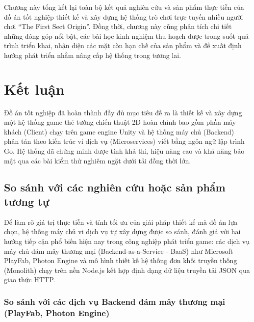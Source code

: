 \documentclass[../Project.tex]{subfiles}
\begin{document}
Chương này tổng kết lại toàn bộ kết quả nghiên cứu và sản phẩm thực tiễn của đồ án tốt nghiệp thiết kế và xây dựng hệ thống trò chơi trực tuyến nhiều người chơi ``The First Sect Origin''. Đồng thời, chương này cũng phân tích chi tiết những đóng góp nổi bật, các bài học kinh nghiệm thu hoạch được trong suốt quá trình triển khai, nhận diện các mặt còn hạn chế của sản phẩm và đề xuất định hướng phát triển nhằm nâng cấp hệ thống trong tương lai.

\section{Kết luận}
\label{sec:conclusion}

Đồ án tốt nghiệp đã hoàn thành đầy đủ mục tiêu đề ra là thiết kế và xây dựng một hệ thống game thẻ tướng chiến thuật 2D hoàn chỉnh bao gồm phần máy khách (Client) chạy trên game engine Unity và hệ thống máy chủ (Backend) phân tán theo kiến trúc vi dịch vụ (Microservices) \cite{newman2021building} viết bằng ngôn ngữ lập trình Go. Hệ thống đã chứng minh được tính khả thi, hiệu năng cao và khả năng bảo mật qua các bài kiểm thử nghiêm ngặt dưới tải đồng thời lớn.

\subsection{So sánh với các nghiên cứu hoặc sản phẩm tương tự}
\label{sec:comparison}

Để làm rõ giá trị thực tiễn và tính tối ưu của giải pháp thiết kế mà đồ án lựa chọn, hệ thống máy chủ vi dịch vụ tự xây dựng được so sánh, đánh giá với hai hướng tiếp cận phổ biến hiện nay trong công nghiệp phát triển game: các dịch vụ máy chủ đám mây thương mại (Backend-as-a-Service - BaaS) như Microsoft PlayFab, Photon Engine và mô hình thiết kế hệ thống đơn khối truyền thống (Monolith) chạy trên nền Node.js kết hợp định dạng dữ liệu truyền tải JSON qua giao thức HTTP.

\subsubsection{So sánh với các dịch vụ Backend đám mây thương mại (PlayFab, Photon Engine)}
\end{document}
